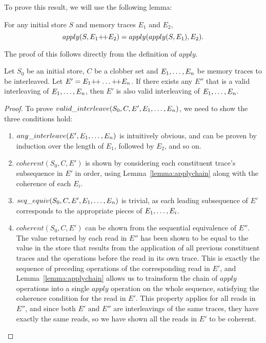 To prove this result, we will use the following lemma:

\begin{lem}
\label{lemma:applychain}
For any initial store $S$ and memory traces $E_1$ and $E_2$,
$$apply(S, E_1 \dplus E_2) = apply(apply(S, E_1), E_2).$$
\end{lem}

The proof of this follows directly from the definition of $apply$.

\begin{thm}
\label{thm:sequential}
Let $S_0$ be an initial store, $C$ be a clobber set and $\oton{E}$ be memory traces to be
interleaved.  Let $E' = E_1 \dplus \ldots \dplus E_n$.  If there exists any $E''$ that is a
valid interleaving of $\oton{E}$, then $E'$ is also valid interleaving of $\oton{E}$.
\end{thm}

\begin{proof}
To prove $valid\_interleave(S_0, C, E', \oton{E})$, we need to show the three conditions hold:
\begin{enumerate}
\item $any\_interleave(E', \oton{E})$ is intuitively obvious, and can be proven by induction over 
the length of $E_1$, followed by $E_2$, and so on.
\item $coherent(S_0, C, E')$ is shown by considering each constituent trace's subsequence in $E'$
in order, using Lemma~\ref{lemma:applychain} along with the coherence of each $E_i$.
\item $seq\_equiv(S_0, C, E', \oton{E})$ is trivial, as each leading subsequence of $E'$ corresponds
to the appropriate pieces of $\otok{i}{E}$.
\item $coherent(S_0, C, E')$ can be shown from the sequential equivalence of $E''$.  The value 
returned by each read in $E''$ has been shown to be equal to the value in the store that results
from the application of all previous constituent traces and the operations before the read in its
own trace.  This is exactly the sequence of preceding operations of the corresponding read in $E'$,
and Lemma~\ref{lemma:applychain} allows us to trainsform the chain of $apply$ operations into a 
single $apply$ operation on the whole sequence, satisfying the coherence condition for the read
in $E'$.  This property applies for all reads in $E''$, and since both $E'$ and $E''$ are
interleavings of the same traces, they have exactly the same reads, so we have shown all the reads
in $E'$ to be coherent.
\end{enumerate}
\end{proof}

